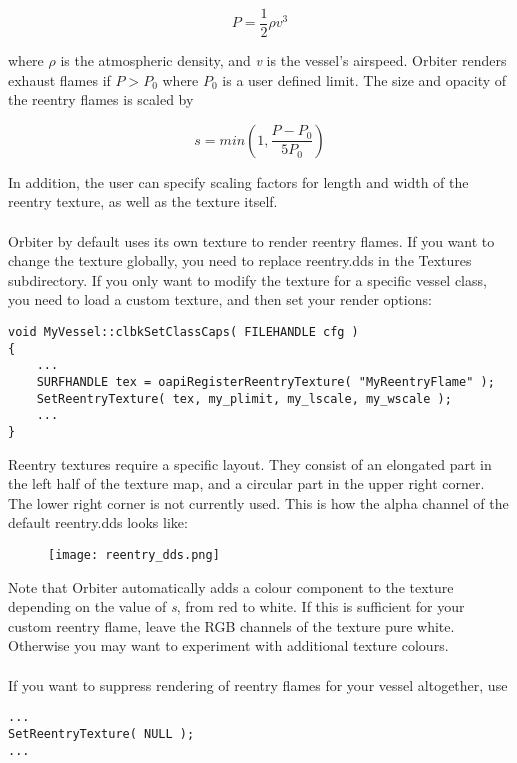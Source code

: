 \documentclass[Orbiter Developer Manual.tex]{subfiles}
\begin{document}
\[ P = \frac{1}{2} \rho v^{3} \]

\noindent
where $\rho$ is the atmospheric density, and \textit{v} is the vessel’s airspeed. Orbiter renders exhaust flames if $P > P_{0}$ where $P_{0}$ is a user defined limit. The size and opacity of the reentry flames is scaled by

\[ s = min\left(1,\frac{P - P_{0}}{5P_{0}}\right) \]

\noindent
In addition, the user can specify scaling factors for length and width of the reentry texture, as well as the texture itself.\\
\\
Orbiter by default uses its own texture to render reentry flames. If you want to change the texture globally, you need to replace reentry.dds in the Textures subdirectory. If you only want to modify the texture for a specific vessel class, you need to load a custom texture, and then set your render options:

\begin{lstlisting}
void MyVessel::clbkSetClassCaps( FILEHANDLE cfg )
{
	...
	SURFHANDLE tex = oapiRegisterReentryTexture( "MyReentryFlame" );
	SetReentryTexture( tex, my_plimit, my_lscale, my_wscale );
	...
}
\end{lstlisting}

\noindent
Reentry textures require a specific layout. They consist of an elongated part in the left half of the texture map, and a circular part in the upper right corner. The lower right corner is not currently used. This is how the alpha channel of the default reentry.dds looks like:

\begin{figure}[H]
  \centering
  \texttt{[image: reentry\_dds.png]}
\end{figure}

\noindent
Note that Orbiter automatically adds a colour component to the texture depending on the value of \textit{s}, from red to white. If this is sufficient for your custom reentry flame, leave the RGB channels of the texture pure white. Otherwise you may want to experiment with additional texture colours.\\
\\
If you want to suppress rendering of reentry flames for your vessel altogether, use

\begin{lstlisting}
...
SetReentryTexture( NULL );
...
\end{lstlisting}
\end{document}
